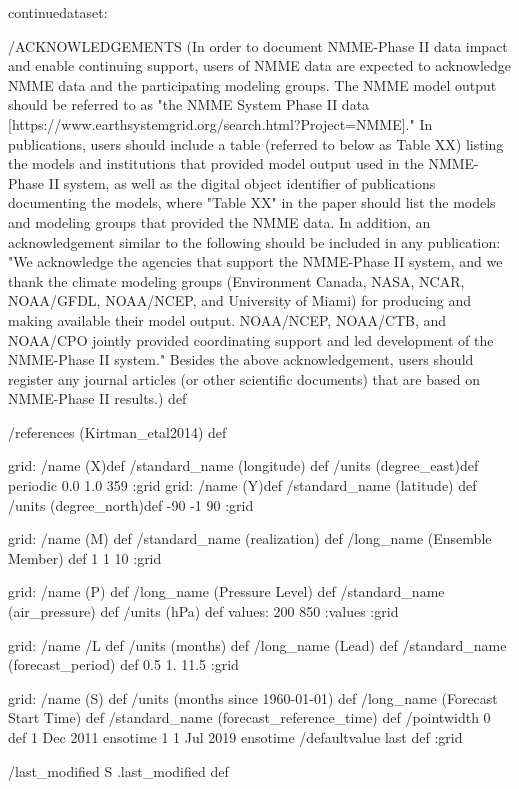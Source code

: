 \begin{ingrid}
continuedataset:

/ACKNOWLEDGEMENTS (In order to document NMME-Phase II data impact and enable continuing support, users of NMME data are expected to acknowledge NMME data and the participating modeling groups. The NMME model output should be referred to as "the NMME System Phase II data [https://www.earthsystemgrid.org/search.html?Project=NMME]."  In publications, users should include a table (referred to below as Table XX) listing the models and institutions that provided model output used in the NMME-Phase II system, as well as the digital object identifier of publications documenting the models, where "Table XX" in the paper should list the models and modeling groups that provided the NMME data.  In addition, an acknowledgement similar to the following should be included in any publication:  "We acknowledge the agencies that support the NMME-Phase II system, and we thank the climate modeling groups (Environment Canada, NASA, NCAR, NOAA/GFDL, NOAA/NCEP, and University of Miami) for producing and making available their model output. NOAA/NCEP, NOAA/CTB, and NOAA/CPO jointly provided coordinating support and led development of the NMME-Phase II system."  Besides the above acknowledgement, users should register any journal articles (or other scientific documents) that are based on NMME-Phase II results.) def


/references (Kirtman_etal2014) def

grid:
/name (X)def
/standard_name (longitude) def
/units (degree_east)def
periodic
 0.0 1.0 359
:grid
grid:
/name (Y)def
/standard_name (latitude) def
/units (degree_north)def
-90 -1 90
:grid

grid:
/name (M) def
/standard_name (realization) def
/long_name (Ensemble Member) def
1 1 10
:grid

grid:
/name (P) def
/long_name (Pressure Level) def
/standard_name (air_pressure) def
/units (hPa) def
values: 200 850 :values
:grid

grid:
/name /L def
/units (months) def
/long_name (Lead) def
/standard_name (forecast_period) def
0.5 1. 11.5
:grid

grid:
/name (S) def
/units (months since 1960-01-01) def
/long_name (Forecast Start Time) def
/standard_name (forecast_reference_time) def
/pointwidth 0 def
1 Dec 2011 ensotime
1
1 Jul 2019 ensotime
/defaultvalue { last } def
:grid

/last_modified S .last_modified def


\end{ingrid}
